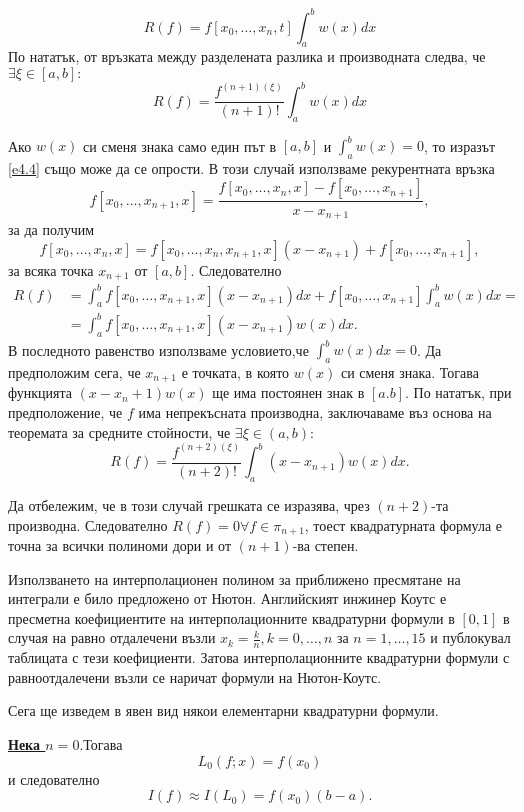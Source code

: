 \documentclass[12pt]{article}
\numberwithin{equation}{section}
\numberwithin{theorem}{section}
\numberwithin{definition}{section}
\numberwithin{corollary}{section}
\begin{document}
\[
R(f)  = f[x_0,\dotso,x_n,t]\int_a^bw(x)dx
\]
По нататък, от връзката между разделената разлика и производната следва, че $\exists\xi\in[a,b]:$
\begin{equation}\label{e4.5}
R(f) = \frac{f^{(n+1)(\xi)}}{(n+1)!}\int_a^bw(x)dx
\end{equation}
\par
Ако $w(x)$ си сменя знака само един път в $[a,b]$ и $\int_a^bw(x)=0$, то изразът \ref{e4.4} също може да се опрости. В този случай използваме рекурентната връзка
\[
f[x_0,\dotso,x_{n+1},x] = \frac{f[x_0,\dotso,x_n,x]-f[x_0,\dotso,x_{n+1}]}{x-x_{n+1}},
\]
за да получим
\[
f[x_0,\dotso,x_n,x] = f[x_0,\dotso,x_n,x_{n+1},x](x-x_{n+1})+f[x_0,\dotso,x_{n+1}],
\]
за всяка точка $x_{n+1}$ от $[a,b]$. Следователно
\begin{align*}
R(f) &= \int_a^bf[x_0,\dotso,x_{n+1},x](x-x_{n+1})dx+f[x_0,\dotso,x_{n+1}]\int_a^bw(x)dx =\\&=\int_a^bf[x_0,\dotso,x_{n+1},x](x-x_{n+1})w(x)dx.
\end{align*}
В последното равенство използваме условието,че $\int_a^bw(x)dx=0$. Да предположим сега, че $x_{n+1}$ е точката, в която $w(x)$ си сменя знака. Тогава функцията $(x-x_n+1)w(x)$ ще има постоянен знак в $[a.b]$. По нататък, при предположение, че $f$ има непрекъсната производна, заключаваме въз основа на теоремата за средните стойности, че $\exists\xi\in(a,b):$
\begin{equation}\label{e4.6}
R(f) = \frac{f^{(n+2)(\xi)}}{(n+2)!}\int_a^b(x-x_{n+1})w(x)dx.
\end{equation}
\par
Да отбележим, че в този случай грешката се изразява, чрез $(n+2)$-та производна. Следователно $R(f)=0\forall f\in\pi_{n+1}$, тоест квадратурната формула е точна за всички полиноми дори и от $(n+1)$-ва степен.
\par
Използването на интерполационен полином за приближено пресмятане на интеграли е било предложено от Нютон. Английският инжинер Коутс е пресметна коефициентите на интерполационните квадратурни формули в $[0,1]$ в случая на равно отдалечени възли $x_k=\frac{k}{n}, k=0,\dotso,n$ за $n=1,\dotso,15$ и публокувал таблицата с тези коефициенти. Затова интерполационните квадратурни формули с равноотдалечени възли се наричат формули на Нютон-Коутс.
\par
Сега ще изведем в явен вид някои елементарни квадратурни формули.
\par
\underline{\textbf{Нека $n=0$}}.Тогава
\[
L_0(f;x) = f(x_0)
\]
и следователно
\[
I(f)\approx I(L_0)=f(x_0)(b-a).
\]
\end{document}
